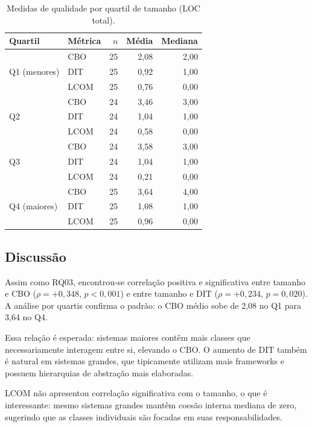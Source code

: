 \documentclass[12pt,a4paper]{article}
\begin{document}
\begin{table}[htbp]
\centering
\caption{Medidas de qualidade por quartil de tamanho (LOC total).}
\label{tab:rq04_quartis}
\small
\begin{tabular}{llrrr}
\toprule
\textbf{Quartil} & \textbf{Métrica} & \textbf{$n$} & \textbf{Média} & \textbf{Mediana} \\
\midrule
\multirow{3}{*}{Q1 (menores)} & CBO & 25 & 2,08 & 2,00 \\
                               & DIT & 25 & 0,92 & 1,00 \\
                               & LCOM& 25 & 0,76 & 0,00 \\
\midrule
\multirow{3}{*}{Q2}            & CBO & 24 & 3,46 & 3,00 \\
                               & DIT & 24 & 1,04 & 1,00 \\
                               & LCOM& 24 & 0,58 & 0,00 \\
\midrule
\multirow{3}{*}{Q3}            & CBO & 24 & 3,58 & 3,00 \\
                               & DIT & 24 & 1,04 & 1,00 \\
                               & LCOM& 24 & 0,21 & 0,00 \\
\midrule
\multirow{3}{*}{Q4 (maiores)}  & CBO & 25 & 3,64 & 4,00 \\
                               & DIT & 25 & 1,08 & 1,00 \\
                               & LCOM& 25 & 0,96 & 0,00 \\
\bottomrule
\end{tabular}
\end{table}

\subsection{Discussão}

Assim como RQ03, encontrou-se correlação positiva e significativa entre tamanho
e CBO ($\rho = +0{,}348$, $p < 0{,}001$) e entre tamanho e DIT ($\rho = +0{,}234$,
$p = 0{,}020$). A análise por quartis confirma o padrão: o CBO médio sobe de
2,08 no Q1 para 3,64 no Q4.

Essa relação é esperada: sistemas maiores contêm mais classes que necessariamente
interagem entre si, elevando o CBO. O aumento de DIT também é natural em
sistemas grandes, que tipicamente utilizam mais frameworks e possuem hierarquias
de abstração mais elaboradas.

LCOM não apresentou correlação significativa com o tamanho, o que é interessante:
mesmo sistemas grandes mantêm coesão interna mediana de zero, sugerindo que
as classes individuais são focadas em suas responsabilidades.
\end{document}
